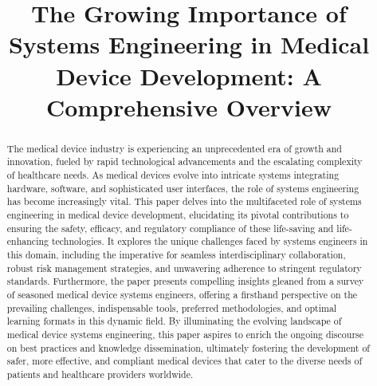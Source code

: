 \documentclass[conference]{IEEEtran}
\begin{document}
\title{The Growing Importance of Systems Engineering in Medical Device Development: A Comprehensive Overview}

\author{
\and
{}
\and
{}
}

\maketitle

\begin{abstract}
    The medical device industry is experiencing an unprecedented era of 
    growth and innovation, fueled by rapid technological advancements and 
    the escalating complexity of healthcare needs. As medical devices evolve 
    into intricate systems integrating hardware, software, and sophisticated 
    user interfaces, the role of systems engineering has become increasingly 
    vital. This paper delves into the multifaceted role of systems 
    engineering in medical device development, elucidating its pivotal 
    contributions to ensuring the safety, efficacy, and regulatory compliance 
    of these life-saving and life-enhancing technologies. It explores the 
    unique challenges faced by systems engineers in this domain, including 
    the imperative for seamless interdisciplinary collaboration, robust 
    risk management strategies, and unwavering adherence to stringent 
    regulatory standards. Furthermore, the paper presents compelling 
    insights gleaned from a survey of seasoned medical device systems 
    engineers, offering a firsthand perspective on the prevailing 
    challenges, indispensable tools, preferred methodologies, and 
    optimal learning formats in this dynamic field. By illuminating the 
    evolving landscape of medical device systems engineering, this paper 
    aspires to enrich the ongoing discourse on best practices and 
    knowledge dissemination, ultimately fostering the development of 
    safer, more effective, and compliant medical devices that cater 
    to the diverse needs of patients and healthcare providers worldwide.
\end{abstract}
\end{document}
